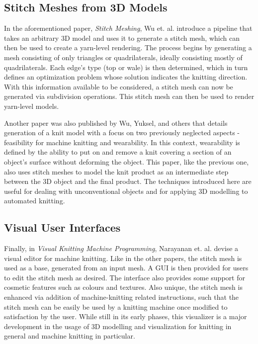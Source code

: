 \documentclass{IEEEcsmag}
\begin{document}
\subsection{Stitch Meshes from 3D Models}

In the aforementioned paper, \textit{Stitch Meshing}, Wu et. al. introduce a pipeline that takes an arbitrary 3D model and uses it to generate a stitch mesh, which can then be used to create a yarn-level rendering. The process begins by generating a mesh consisting of only triangles or quadrilaterals, ideally consisting mostly of quadrilaterals. Each edge's type (top or wale) is then determined, which in turn defines an optimization problem whose solution indicates the knitting direction. With this information available to be considered, a stitch mesh can now be generated via subdivision operations. This stitch mesh can then be used to render yarn-level models.

Another paper was also published by Wu, Yuksel, and others that details generation of a knit model with a focus on two previously neglected aspects - feasibility for machine knitting and wearability. In this context, wearability is defined by the ability to put on and remove a knit covering a section of an object's surface without deforming the object. This paper, like the previous one, also uses stitch meshes to model the knit product as an intermediate step between the 3D object and the final product. The techniques introduced here are useful for dealing with unconventional objects and for applying 3D modelling to automated knitting.

\subsection{Visual User Interfaces}

Finally, in \textit{Visual Knitting Machine Programming}, Narayanan et. al. devise a visual editor for machine knitting. Like in the other papers, the stitch mesh is used as a base, generated from an input mesh. A GUI is then provided for users to edit the stitch mesh as desired. The interface also provides some support for cosmetic features such as colours and textures. Also unique, the stitch mesh is enhanced via addition of machine-knitting related instructions, such that the stitch mesh can be easily be used by a knitting machine once modified to satisfaction by the user. While still in its early phases, this visualizer is a major development in the usage of 3D modelling and visualization for knitting in general and machine knitting in particular.
\end{document}

